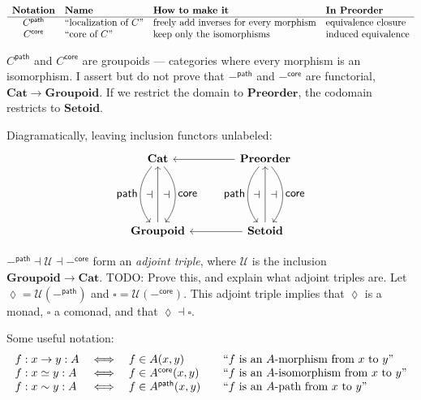 \documentclass{article}
\newcommand{\todo}[1]{{\color{red}#1}}
\newcommand{\ms}[1]{\ensuremath{\mathsf{#1}}}
\newcommand{\mb}[1]{\ensuremath{\mathbf{#1}}}
\newcommand{\mc}[1]{\ensuremath{\mathcal{#1}}}
\newcommand{\iso}{\ms{core}}
\renewcommand{\path}{\ms{path}}
\newcommand{\pathto}{\sim}
\begin{document}
\[
\begin{array}{clll}
  \multicolumn{1}{l}{\textbf{Notation}}
  & \multicolumn{1}{l}{\textbf{Name}}
  & \multicolumn{1}{l}{\textbf{How to make it}}
  & \multicolumn{1}{l}{\textbf{In $\mb{Preorder}$}}
  \\\hline
  C^\path
  & \text{``localization of $C$''}
  & \text{freely add inverses for every morphism}
  & \text{equivalence closure}
  \\
  C^\iso
  & \text{``core of $C$''}
  & \text{keep only the isomorphisms}
  & \text{induced equivalence}
\end{array}
\]

$C^\path$ and $C^\iso$ are groupoids --- categories where every morphism is an
isomorphism. I assert but do not prove that $-^\path$ and $-^\iso$ are
functorial, $\mb{Cat} \to \mb{Groupoid}$. If we restrict the domain to
$\mb{Preorder}$, the codomain restricts to $\mb{Setoid}$.

Diagramatically, leaving inclusion functors unlabeled:
{\large\[
  \tikzset{
    no line/.style={draw=none,
      commutative diagrams/every label/.append style={/tikz/auto=false}}}
  \begin{tikzcd}[row sep=5em,column sep=4em]
    \mb{Cat}
    \arrow[d,bend right=40,"\textstyle\path"'{name=A}]
    \arrow[d,bend left=40,"\textstyle\iso"{name=C}]
    & \mb{Preorder}
    \arrow[d,bend right=40,"\textstyle\path"'{name=A2}]
    \arrow[d,bend left=40,"\textstyle\iso"{name=C2}]
    \arrow[l]
    \\
    \mb{Groupoid} \arrow[u,""{name=B}]
    & \mb{Setoid} \arrow{u}[name=B2]{} \arrow[l]
    \arrow[to path={(A) -- (B)\tikztonodes}, no line, near end]{}{\displaystyle\dashv}
    \arrow[to path={(B) -- (C)\tikztonodes}, no line]{}{\displaystyle\dashv}
    \arrow[to path={(A2) -- (B2)\tikztonodes}, no line, near end]{}{\displaystyle\dashv}
    \arrow[to path={(B2) -- (C2)\tikztonodes}, no line]{}{\displaystyle\dashv}
  \end{tikzcd}
\]}

$-^\path \dashv \mc{U} \dashv -^\iso$ form an \emph{adjoint triple}, where
$\mc{U}$ is the inclusion $\mb{Groupoid} \to \mb{Cat}$. \todo{TODO:
  Prove this, and explain what adjoint triples are.}
%
Let $\lozenge = \mc{U}(-^\path)$ and $\square = \mc{U}(-^\iso)$. This adjoint
triple implies that $\lozenge$ is a monad, $\square$ a comonad, and that
$\lozenge \dashv \square$.

Some useful notation:
\[\begin{array}{lcl@{\hskip 2em}l}
  f : x \to y : A &\iff& f \in A(x,y)
  & \text{``$f$ is an $A$-morphism from $x$ to $y$''}\\
  f : x \simeq y : A &\iff& f \in A^\iso(x,y)
  & \text{``$f$ is an $A$-isomorphism from $x$ to $y$''}\\
  f : x \pathto y : A &\iff& f \in A^\path(x,y)
  & \text{``$f$ is an $A$-path from $x$ to $y$''}
\end{array}\]
\end{document}
